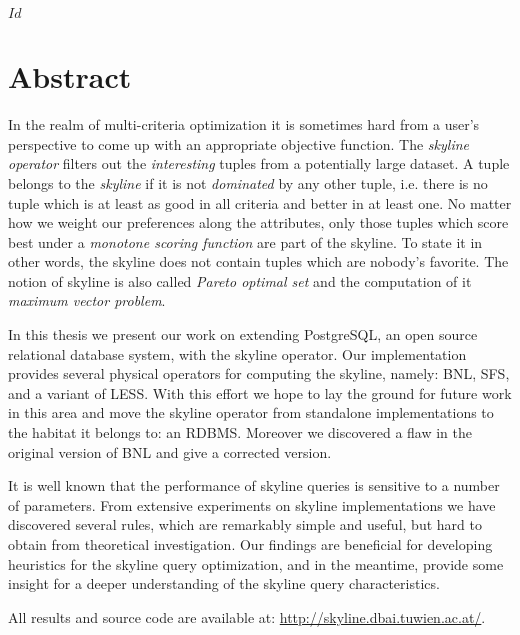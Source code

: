 
\svnInfo $Id$


\chapter*{Abstract\revision}


In the realm of multi-criteria optimization it is sometimes hard from
a user's perspective to come up with an appropriate objective
function.
%
The \emph{skyline operator} filters out the \emph{interesting} tuples
from a potentially large dataset.  A tuple belongs to the \emph{skyline} if
it is not \emph{dominated} by any other tuple, i.e. there is no tuple
which is at least as good in all criteria and better in at least one.
%
No matter how we weight our preferences along the attributes, only
those tuples which score best under a \emph{monotone scoring function} are
part of the skyline.
%
To state it in other words, the skyline does not contain tuples which
are nobody's favorite.
%
The notion of skyline is also called \emph{Pareto optimal set} and the
computation of it \emph{maximum vector problem}.


In this thesis we present our work on extending PostgreSQL, an open
source relational database system, with the skyline operator.
%
Our implementation provides several physical operators for computing
the skyline, namely: BNL, SFS, and a variant of LESS.
%
With this effort we hope to lay the ground for future work in this
area and move the skyline operator from standalone implementations to
the habitat it belongs to: an RDBMS.
%
Moreover we discovered a flaw in the original version of BNL and give
a corrected version.

It is well known that the performance of skyline queries is sensitive
to a number of parameters.  
%
From extensive experiments on skyline implementations we have
discovered several rules, which are remarkably simple and useful, but
hard to obtain from theoretical investigation.
%
Our findings are beneficial for developing heuristics for the skyline
query optimization, and in the meantime, provide some insight for a
deeper understanding of the skyline query characteristics.

All results and source code are available at:
\url{http://skyline.dbai.tuwien.ac.at/}.
